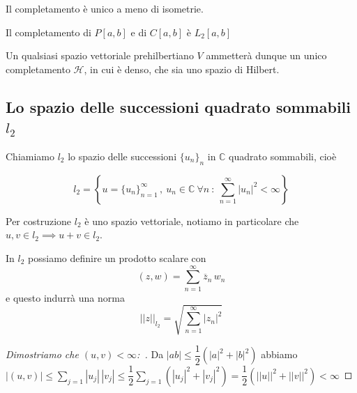 \documentclass[11pt,a4paper,twoside]{book}
\newenvironment{esempio}[1][Esempio]{ 
  \begin{center}\begin{tcolorbox}[
  title={#1:~},
  width=0.9\linewidth,
  flush right,
  enhanced jigsaw, 
  colback=white, 
  frame hidden, 
  sharpish corners, arc=3mm,
  borderline west = {1pt}{0pt}{gray},
  borderline south = {1pt}{0pt}{gray},
  coltitle=black, 
  fonttitle=\small\bfseries, 
  attach title to upper, 
  breakable,
  top=2.5pt, bottom=0.3pt]\small
  }{
 \normalsize \end{tcolorbox}\end{center}
}
\newenvironment{dimo}[1][\proofname]{
	\begin{tcolorbox}[
	breakable, 
	enhanced, 
	interior hidden, 
	frame hidden, 
	borderline west = {1pt}{0pt}{gray}, 
	top=0pt, bottom=0pt, left=0pt]
\begin{proof}[#1:~]
}
{
\end{proof}
\end{tcolorbox}
}
\theoremstyle{esss}
\theoremstyle{dotless}
\numberwithin{equation}{section} %
\begin{document}
Il completamento è unico a meno di isometrie.

\begin{esempio}
Il completamento di $P[a,b]$ e di $C[a,b]$ è $L_2[a,b]$
\end{esempio}
 
Un qualsiasi spazio vettoriale prehilbertiano $V$ ammetterà dunque un unico completamento $\mathcal{H}$, in cui è denso, che sia uno spazio di Hilbert.



\subsection{Lo spazio delle successioni quadrato sommabili $l_2$\ }

Chiamiamo $l_2$ lo spazio delle successioni $\{u_n\}_{n}$ in $\mathbb{C}$ quadrato sommabili, cioè 

\[l_2=\left\{ u=\{u_n\}_{n=1}^\infty\,, \> u_n\in\mathbb{C} \> \forall n \> : \> \sum_{n=1}^\infty |u_n|^2<\infty\right\}\]

Per costruzione $l_2$ è uno spazio vettoriale, notiamo in particolare che $u,v\in l_2\implies u+v\in l_2$.

In $l_2$ possiamo definire un prodotto scalare con \begin{equation} (z,w)=\sum_{n=1}^\infty \overline{z}_n\,w_n \end{equation} e questo indurrà una norma \begin{equation} ||z||_{l_2}=\sqrt{\sum_{n=1}^\infty |z_n|^2 }\end{equation}

\begin{dimo}[Dimostriamo che $(u,v)<\infty$]
Da $|ab|\leq\dfrac{1}{2}(|a|^2+|b|^2)$ abbiamo $|(u,v)|\leq\sum_{j=1}|u_j|\,|v_j| \leq \dfrac{1}{2}\sum_{j=1}(|u_j|^2+|v_j|^2)=\dfrac{1}{2}\left( ||u||^2+||v||^2\right)<\infty$
\end{dimo}
\end{document}
